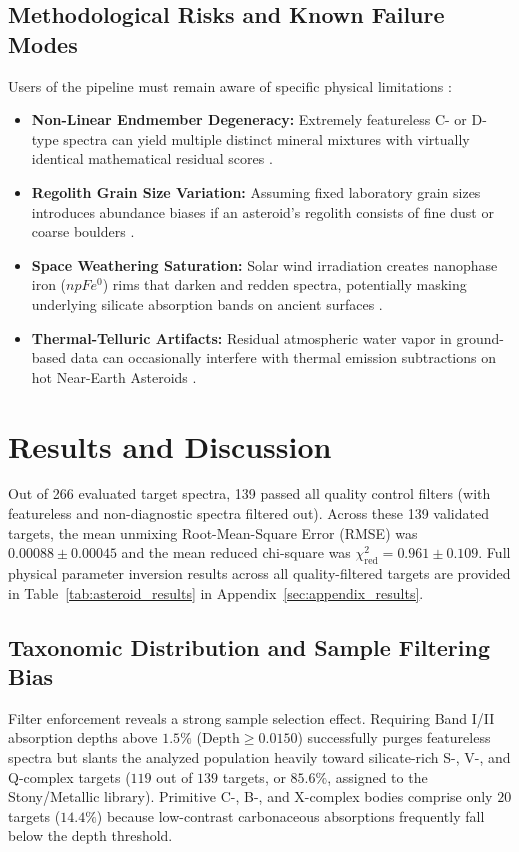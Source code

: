 \documentclass[11pt,a4paper]{article}
\begin{document}
\subsection{Methodological Risks and Known Failure Modes}
Users of the pipeline must remain aware of specific physical limitations \cite{Crown1987, Brunetto2006, Hapke2001, Bioucas2012}:
\begin{itemize}
    \item \textbf{Non-Linear Endmember Degeneracy:} Extremely featureless C- or D-type spectra can yield multiple distinct mineral mixtures with virtually identical mathematical residual scores \cite{Bioucas2012}.
    \item \textbf{Regolith Grain Size Variation:} Assuming fixed laboratory grain sizes introduces abundance biases if an asteroid's regolith consists of fine dust or coarse boulders \cite{Crown1987}.
    \item \textbf{Space Weathering Saturation:} Solar wind irradiation creates nanophase iron ($npFe^0$) rims that darken and redden spectra, potentially masking underlying silicate absorption bands on ancient surfaces \cite{Brunetto2006, Hapke2001, Pieters2000, Sasaki2001}.
    \item \textbf{Thermal-Telluric Artifacts:} Residual atmospheric water vapor in ground-based data can occasionally interfere with thermal emission subtractions on hot Near-Earth Asteroids \cite{Harris1998, Rivkin2005, Wolters2008}.
\end{itemize}

\section{Results and Discussion}
\label{sec:results}

Out of 266 evaluated target spectra, 139 passed all quality control filters (with featureless and non-diagnostic spectra filtered out). Across these 139 validated targets, the mean unmixing Root-Mean-Square Error (RMSE) was $0.00088 \pm 0.00045$ and the mean reduced chi-square was $\chi^2_{\text{red}} = 0.961 \pm 0.109$. Full physical parameter inversion results across all quality-filtered targets are provided in Table~\ref{tab:asteroid_results} in Appendix~\ref{sec:appendix_results}.

\subsection{Taxonomic Distribution and Sample Filtering Bias}
Filter enforcement reveals a strong sample selection effect. Requiring Band I/II absorption depths above $1.5\%$ ($\text{Depth} \ge 0.0150$) successfully purges featureless spectra but slants the analyzed population heavily toward silicate-rich S-, V-, and Q-complex targets ($119$ out of $139$ targets, or $85.6\%$, assigned to the Stony/Metallic library). Primitive C-, B-, and X-complex bodies comprise only $20$ targets ($14.4\%$) because low-contrast carbonaceous absorptions frequently fall below the depth threshold.
\end{document}
